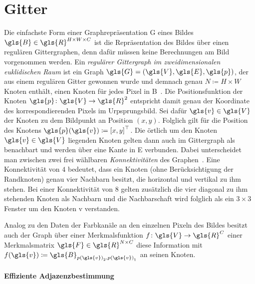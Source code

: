 \section{Gitter}
\label{gitter}

Die einfachste Form einer Graphrepräsentation \gls{G} eines Bildes $\gls{B} \in \gls{R}^{H \times W \times C}$ ist die Repräsentation des Bildes über einen regulären Gittergraphen, denn dafür müssen keine Berechnungen am Bild vorgenommen werden.
Ein \emph{regulärer Gittergraph im zweidimensionalen euklidischen Raum} ist ein Graph $\gls{G} = \left(\gls{V}, \gls{E}, \gls{p}\right)$, der aus einem regulären Gitter gewonnen wurde und demnach genau $N \coloneqq H \times W$ Knoten enthält, \dhe{} einen Knoten für jedes Pixel in \gls{B}~\cite{Defferrard}.
Die Positionsfunktion der Knoten $\gls{p} \colon \gls{V} \to \gls{R}^2$ entspricht damit genau der Koordinate des korrespondierenden Pixels im Urpsprungsbild.
Sei dafür $\gls{v} \in \gls{V}$ der Knoten zu dem Bildpunkt an Position $\left(x,y\right)$.
Folglich gilt für die Position des Knotens $\gls{p}\left(\gls{v}\right) \coloneqq {\left[x,y\right]}^{\top}$.
Die örtlich um den Knoten $\gls{v} \in \gls{V}$ liegenden Knoten gelten dann auch im Gittergraph als benachbart und werden über eine Kante in \gls{E} verbunden.
Dabei unterscheidet man zwischen zwei frei wählbaren \emph{Konnektivitäten} des Graphen~\cite{Defferrard}.
Eine Konnektivität von $4$ bedeutet, dass ein Knoten (ohne Berücksichtigung der Randknoten) genau vier Nachbarn besitzt, die horizontal und vertikal zu ihm stehen.
Bei einer Konnektivität von $8$ gelten zusätzlich die vier diagonal zu ihm stehenden Knoten als Nachbarn und die Nachbarschaft wird folglich als ein $3 \times 3$ Fenster um den Knoten \gls{v} verstanden.

Analog zu den Daten der Farbkanäle an den einzelnen Pixeln des Bildes besitzt auch der Graph über einer Merkmalsfunktion $f \colon \gls{V} \to \gls{R}^C$ \bzw{} einer Merkmalsmatrix $\gls{F} \in \gls{R}^{N \times C}$ diese Information mit $f\left(\gls{v}\right) \coloneqq \gls{B}_{{p\left(\gls{v}\right)}_2,{p\left(\gls{v}\right)}_1}$ an seinen Knoten.

\paragraph{Effiziente Adjazenzbestimmung}
\label{adjazenzbestimmung_gitter}

